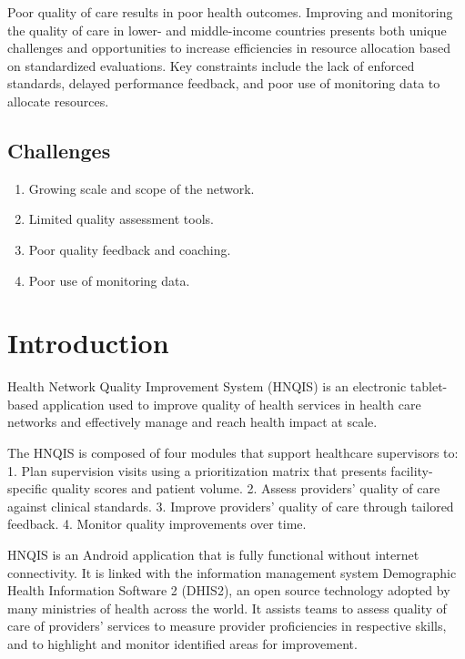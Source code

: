 \documentclass[]{book}
\providecommand{\tightlist}{%
  \setlength{\itemsep}{0pt}\setlength{\parskip}{0pt}}
\begin{document}
Poor quality of care results in poor health outcomes. Improving and monitoring the quality of care in lower- and middle-income countries presents both unique challenges and opportunities to increase efficiencies in resource allocation based on standardized evaluations. Key constraints include the lack of enforced standards, delayed performance feedback, and poor use of monitoring data to allocate resources.

\hypertarget{challenges}{%
\subsection{Challenges}\label{challenges}}

\begin{enumerate}
\def\labelenumi{\arabic{enumi}.}
\tightlist
\item
  Growing scale and scope of the network.
\item
  Limited quality assessment tools.
\item
  Poor quality feedback and coaching.
\item
  Poor use of monitoring data.
\end{enumerate}

\hypertarget{introduction-4}{%
\section{Introduction}\label{introduction-4}}

Health Network Quality Improvement System (HNQIS) is an electronic tablet-based application used to improve quality of health services in health care networks and effectively manage and reach health impact at scale.

The HNQIS is composed of four modules that support healthcare supervisors to:
1. Plan supervision visits using a prioritization matrix that presents facility-specific quality scores and patient volume.
2. Assess providers' quality of care against clinical standards.
3. Improve providers' quality of care through tailored feedback.
4. Monitor quality improvements over time.

HNQIS is an Android application that is fully functional without internet connectivity. It is linked with the information management system Demographic Health Information Software 2 (DHIS2), an open source technology adopted by many ministries of health across the world. It assists teams to assess quality of care of providers' services to measure provider proficiencies in respective skills, and to highlight and monitor identified areas for improvement.
\end{document}
